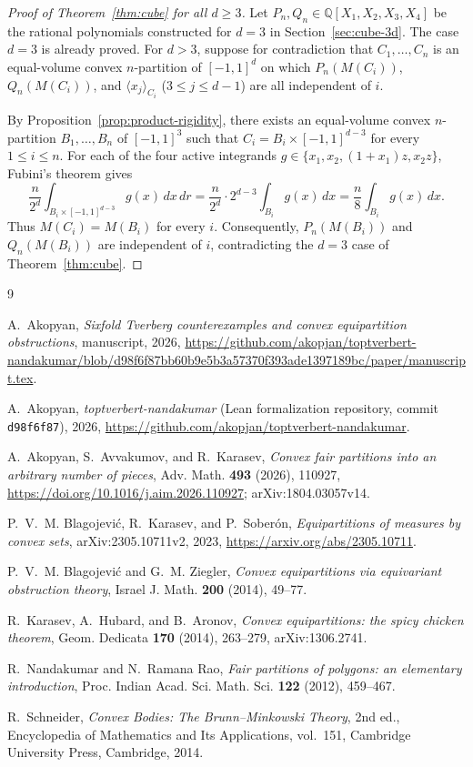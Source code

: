 \documentclass[11pt,a4paper]{amsart}
\numberwithin{equation}{section}
\theoremstyle{definition}
\newcommand{\Q}{\mathbb{Q}}
\newcommand{\avg}[2]{\langle #1 \rangle_{#2}}
\begin{document}
\begin{proof}[Proof of Theorem~\ref{thm:cube} for all $d \ge 3$]
Let $P_n, Q_n \in \Q[X_1,X_2,X_3,X_4]$ be the rational polynomials constructed for $d = 3$ in Section~\ref{sec:cube-3d}. The case $d = 3$ is already proved. For $d > 3$, suppose for contradiction that $C_1, \dots, C_n$ is an equal-volume convex $n$-partition of $[-1,1]^d$ on which $P_n(M(C_i))$, $Q_n(M(C_i))$, and $\avg{x_j}{C_i}$ ($3 \le j \le d-1$) are all independent of $i$.

By Proposition~\ref{prop:product-rigidity}, there exists an equal-volume convex $n$-partition $B_1, \dots, B_n$ of $[-1,1]^3$ such that $C_i = B_i \times [-1,1]^{d-3}$ for every $1 \le i \le n$. For each of the four active integrands $g \in \{x_1, x_2, (1+x_1)z, x_2 z\}$, Fubini's theorem gives
\[
\frac{n}{2^d} \int_{B_i \times [-1,1]^{d-3}} g(x)\, dx\, dr = \frac{n}{2^d} \cdot 2^{d-3} \int_{B_i} g(x)\, dx = \frac{n}{8} \int_{B_i} g(x)\, dx.
\]
Thus $M(C_i) = M(B_i)$ for every $i$. Consequently, $P_n(M(B_i))$ and $Q_n(M(B_i))$ are independent of $i$, contradicting the $d = 3$ case of Theorem~\ref{thm:cube}.
\end{proof}

\begin{thebibliography}{9}

A.~Akopyan,
\emph{Sixfold Tverberg counterexamples and convex equipartition obstructions},
manuscript, 2026,
\url{https://github.com/akopjan/toptverbert-nandakumar/blob/d98f6f87bb60b9e5b3a57370f393ade1397189bc/paper/manuscript.tex}.

A.~Akopyan,
\emph{toptverbert-nandakumar} (Lean formalization repository, commit \texttt{d98f6f87}),
2026,
\url{https://github.com/akopjan/toptverbert-nandakumar}.

A.~Akopyan, S.~Avvakumov, and R.~Karasev,
\emph{Convex fair partitions into an arbitrary number of pieces},
Adv. Math. \textbf{493} (2026), 110927,
\url{https://doi.org/10.1016/j.aim.2026.110927};
arXiv:1804.03057v14.

P.~V.~M. Blagojevi\'c, R.~Karasev, and P.~Sober\'on,
\emph{Equipartitions of measures by convex sets},
arXiv:2305.10711v2, 2023,
\url{https://arxiv.org/abs/2305.10711}.

P.~V.~M. Blagojevi\'c and G.~M. Ziegler,
\emph{Convex equipartitions via equivariant obstruction theory},
Israel J. Math. \textbf{200} (2014), 49--77.

R.~Karasev, A.~Hubard, and B.~Aronov,
\emph{Convex equipartitions: the spicy chicken theorem},
Geom. Dedicata \textbf{170} (2014), 263--279, arXiv:1306.2741.

R.~Nandakumar and N.~Ramana Rao,
\emph{Fair partitions of polygons: an elementary introduction},
Proc. Indian Acad. Sci. Math. Sci. \textbf{122} (2012), 459--467.

R.~Schneider,
\emph{Convex Bodies: The Brunn--Minkowski Theory},
2nd ed., Encyclopedia of Mathematics and Its Applications, vol.~151,
Cambridge University Press, Cambridge, 2014.

\end{thebibliography}
\end{document}
